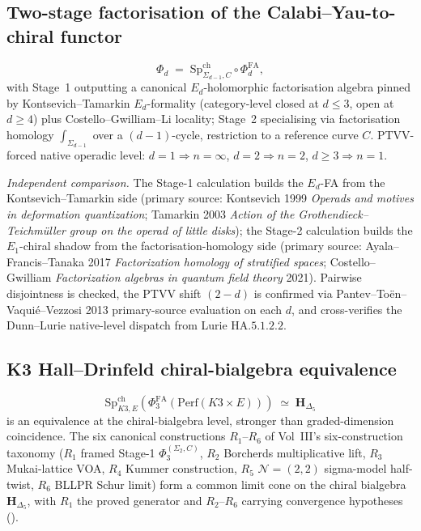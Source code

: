 \subsection{Two-stage factorisation of the Calabi--Yau-to-chiral functor}
\label{v4-subsec:two-stage-cy-functor}

\[
 \Phi_d \;=\; \mathrm{Sp}^{\mathrm{ch}}_{\Sigma_{d-1},C}\circ\Phi^{\mathrm{FA}}_d,
\]
with Stage~1 outputting a canonical \(E_d\)-holomorphic factorisation
algebra pinned by Kontsevich--Tamarkin \(E_d\)-formality
(category-level closed at \(d \le 3\), open at \(d \ge 4\)) plus
Costello--Gwilliam--Li locality; Stage~2 specialising via
factorisation homology \(\int_{\Sigma_{d-1}}\) over a \((d-1)\)-cycle,
restriction to a reference curve \(C\). PTVV-forced native operadic
level: \(d=1 \Rightarrow n=\infty\), \(d=2 \Rightarrow n=2\),
\(d \ge 3 \Rightarrow n=1\).

\noindent\emph{Independent comparison.} The Stage-1 calculation builds the
\(E_d\)-FA from the Kontsevich--Tamarkin side (primary source:
Kontsevich 1999 \textit{Operads and motives in deformation
quantization}; Tamarkin 2003 \textit{Action of the Grothendieck--Teichm\"uller
group on the operad of little disks}); the Stage-2 calculation builds the
\(E_1\)-chiral shadow from the factorisation-homology side (primary
source: Ayala--Francis--Tanaka 2017 \textit{Factorization
homology of stratified spaces}; Costello--Gwilliam \textit{Factorization
algebras in quantum field theory} 2021). Pairwise
disjointness is checked, the PTVV shift \((2-d)\) is confirmed via Pantev--To\"en--Vaqui\'e--Vezzosi
2013 primary-source evaluation on each \(d\), and cross-verifies the
Dunn--Lurie native-level dispatch from Lurie \(\mathrm{HA}.5.1.2.2\).

\subsection{K3 Hall--Drinfeld chiral-bialgebra equivalence}
\label{v4-subsec:k3-hall-drinfeld-equivalence}

\[
 \mathrm{Sp}^{\mathrm{ch}}_{K3,E}(\Phi^{\mathrm{FA}}_3(\mathrm{Perf}(K3\times E)))
 \;\simeq\; \mathbf H_{\Delta_5}
\]
is an equivalence at the chiral-bialgebra level, stronger than
graded-dimension coincidence. The six canonical constructions
\(R_1\)--\(R_6\) of Vol~III's six-construction taxonomy
(\(R_1\) framed Stage-1 \(\Phi_3^{(\Sigma_2,C)}\), \(R_2\) Borcherds
multiplicative lift, \(R_3\) Mukai-lattice VOA, \(R_4\) Kummer
construction, \(R_5\) \(\mathcal{N}=(2,2)\) sigma-model half-twist,
\(R_6\) BLLPR Schur limit) form a common limit cone on the chiral
bialgebra \(\mathbf{H}_{\Delta_5}\), with \(R_1\) the proved
generator and \(R_2\)--\(R_6\) carrying convergence hypotheses
().

